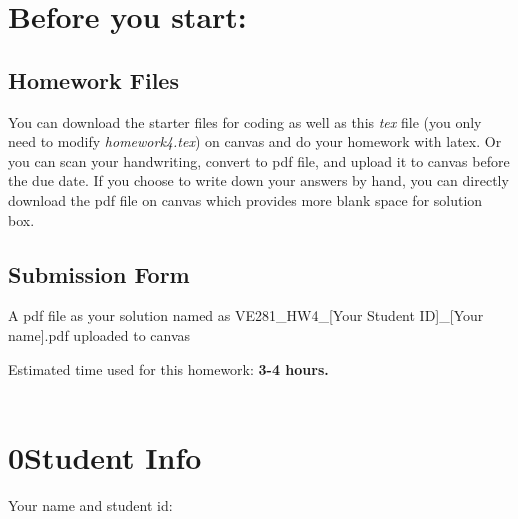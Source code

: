 \documentclass[11pt]{exam}
\begin{document}
\setlength{\parindent}{0pt}
\section*{Before you start:}

\subsection*{Homework Files}
You can download the starter files for coding as well as this \textit{tex} file (you only need to modify \textit{homework4.tex}) on canvas and do your homework with latex. 
Or you can scan your handwriting, convert to pdf file, and upload it to canvas before the due date. If you choose to write down your answers by hand, you can directly download the pdf file on canvas which provides more blank space for solution box.\\

\subsection*{Submission Form}
A pdf file as your solution named as VE281\_HW4\_[Your Student ID]\_[Your name].pdf uploaded to canvas


Estimated time used for this homework: \textbf{3-4 hours.}
\\\\


\newpage
\section*{0\quad Student Info}
Your name and student id:
\begin{solution}
\end{solution}
\end{document}
